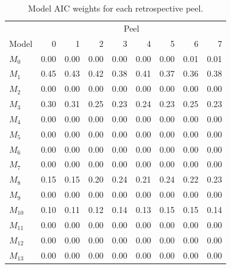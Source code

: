 \documentclass[
]{article}
\begin{document}
\begin{table}

\caption{\label{tab:aic-wts-table}Model AIC weights for each retrospective peel.}
\centering
\begin{tabular}[t]{lrrrrrrrr}
\toprule
\multicolumn{1}{c}{ } & \multicolumn{8}{c}{Peel} \\
\cmidrule(l{3pt}r{3pt}){2-9}
Model & 0 & 1 & 2 & 3 & 4 & 5 & 6 & 7\\
\midrule
$M_{0}$ & 0.00 & 0.00 & 0.00 & 0.00 & 0.00 & 0.00 & 0.01 & 0.01\\
$M_{1}$ & 0.45 & 0.43 & 0.42 & 0.38 & 0.41 & 0.37 & 0.36 & 0.38\\
$M_{2}$ & 0.00 & 0.00 & 0.00 & 0.00 & 0.00 & 0.00 & 0.00 & 0.00\\
$M_{3}$ & 0.30 & 0.31 & 0.25 & 0.23 & 0.24 & 0.23 & 0.25 & 0.23\\
$M_{4}$ & 0.00 & 0.00 & 0.00 & 0.00 & 0.00 & 0.00 & 0.00 & 0.00\\
\addlinespace
$M_{5}$ & 0.00 & 0.00 & 0.00 & 0.00 & 0.00 & 0.00 & 0.00 & 0.00\\
$M_{6}$ & 0.00 & 0.00 & 0.00 & 0.00 & 0.00 & 0.00 & 0.00 & 0.00\\
$M_{7}$ & 0.00 & 0.00 & 0.00 & 0.00 & 0.00 & 0.00 & 0.00 & 0.00\\
$M_{8}$ & 0.15 & 0.15 & 0.20 & 0.24 & 0.21 & 0.24 & 0.22 & 0.23\\
$M_{9}$ & 0.00 & 0.00 & 0.00 & 0.00 & 0.00 & 0.00 & 0.00 & 0.00\\
\addlinespace
$M_{10}$ & 0.10 & 0.11 & 0.12 & 0.14 & 0.13 & 0.15 & 0.15 & 0.14\\
$M_{11}$ & 0.00 & 0.00 & 0.00 & 0.00 & 0.00 & 0.00 & 0.00 & 0.00\\
$M_{12}$ & 0.00 & 0.00 & 0.00 & 0.00 & 0.00 & 0.00 & 0.00 & 0.00\\
$M_{13}$ & 0.00 & 0.00 & 0.00 & 0.00 & 0.00 & 0.00 & 0.00 & 0.00\\
\bottomrule
\end{tabular}
\end{table}
\end{document}
